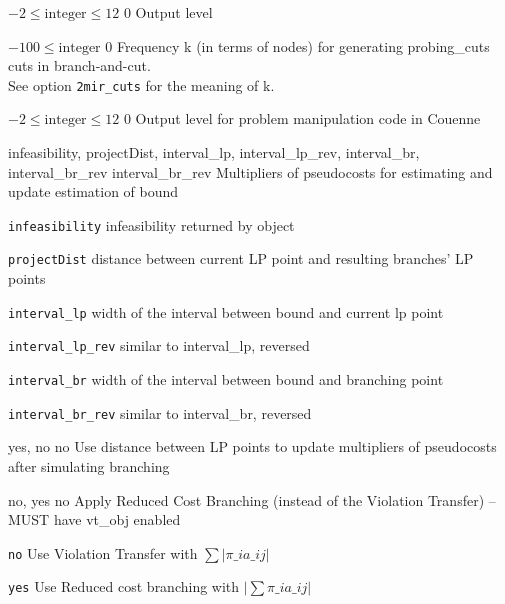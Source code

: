 %
{$-2\leq\textrm{integer}\leq12$}%
{$0$}%
{Output level}%
{}

%
{$-100\leq\textrm{integer}$}%
{$0$}%
{Frequency k (in terms of nodes) for generating probing\_cuts cuts in branch-and-cut.\\
See option \texttt{2mir\_cuts} for the meaning of k.}%
{}

%
{$-2\leq\textrm{integer}\leq12$}%
{$0$}%
{Output level for problem manipulation code in Couenne}%
{}

%
{\ttfamily infeasibility, projectDist, interval\_lp, interval\_lp\_rev, interval\_br, interval\_br\_rev}%
{interval\_br\_rev}%
{Multipliers of pseudocosts for estimating and update estimation of bound}%
{\begin{list}{}{
\setlength{\parsep}{0em}
\setlength{\leftmargin}{5ex}
\setlength{\labelwidth}{2ex}
\setlength{\itemindent}{0ex}
\setlength{\topsep}{0pt}}
\item[\texttt{infeasibility}] infeasibility returned by object
\item[\texttt{projectDist}] distance between current LP point and resulting branches' LP points
\item[\texttt{interval\_lp}] width of the interval between bound and current lp point
\item[\texttt{interval\_lp\_rev}] similar to interval\_lp, reversed
\item[\texttt{interval\_br}] width of the interval between bound and branching point
\item[\texttt{interval\_br\_rev}] similar to interval\_br, reversed
\end{list}
}

%
{\ttfamily yes, no}%
{no}%
{Use distance between LP points to update multipliers of pseudocosts after simulating branching}%
{}

%
{\ttfamily no, yes}%
{no}%
{Apply Reduced Cost Branching (instead of the Violation Transfer) -- MUST have vt\_obj enabled}%
{\begin{list}{}{
\setlength{\parsep}{0em}
\setlength{\leftmargin}{5ex}
\setlength{\labelwidth}{2ex}
\setlength{\itemindent}{0ex}
\setlength{\topsep}{0pt}}
\item[\texttt{no}] Use Violation Transfer with $\sum |\pi\_i a\_{ij}|$
\item[\texttt{yes}] Use Reduced cost branching with $|\sum \pi\_i a\_{ij}|$
\end{list}
}

